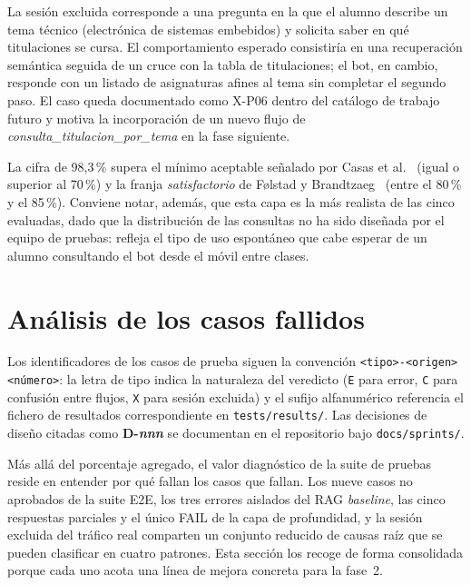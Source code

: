 La sesión excluida corresponde a una pregunta en la que el alumno describe un tema técnico (electrónica de sistemas embebidos) y solicita saber en qué titulaciones se cursa. El comportamiento esperado consistiría en una recuperación semántica seguida de un cruce con la tabla de titulaciones; el bot, en cambio, responde con un listado de asignaturas afines al tema sin completar el segundo paso. El caso queda documentado como X-P06 dentro del catálogo de trabajo futuro y motiva la incorporación de un nuevo flujo de \textit{consulta\_titulacion\_por\_tema} en la fase siguiente.

La cifra de 98,3\,\% supera el mínimo aceptable señalado por Casas et al.~\cite{casas2020trends} (igual o superior al 70\,\%) y la franja \textit{satisfactorio} de Følstad y Brandtzaeg~\cite{folstad2020users} (entre el 80\,\% y el 85\,\%). Conviene notar, además, que esta capa es la más realista de las cinco evaluadas, dado que la distribución de las consultas no ha sido diseñada por el equipo de pruebas: refleja el tipo de uso espontáneo que cabe esperar de un alumno consultando el bot desde el móvil entre clases.

\section{Análisis de los casos fallidos}\label{sec:pruebas-casos-fallidos}

Los identificadores de los casos de prueba siguen la convención \texttt{<tipo>-<origen><número>}: la letra de tipo indica la naturaleza del veredicto (\texttt{E} para error, \texttt{C} para confusión entre flujos, \texttt{X} para sesión excluida) y el sufijo alfanumérico referencia el fichero de resultados correspondiente en \texttt{tests/results/}. Las decisiones de diseño citadas como \textbf{D-\textit{nnn}} se documentan en el repositorio bajo \texttt{docs/sprints/}.

Más allá del porcentaje agregado, el valor diagnóstico de la suite de pruebas reside en entender por qué fallan los casos que fallan. Los nueve casos no aprobados de la suite E2E, los tres errores aislados del RAG \textit{baseline}, las cinco respuestas parciales y el único FAIL de la capa de profundidad, y la sesión excluida del tráfico real comparten un conjunto reducido de causas raíz que se pueden clasificar en cuatro patrones. Esta sección los recoge de forma consolidada porque cada uno acota una línea de mejora concreta para la fase~2.

